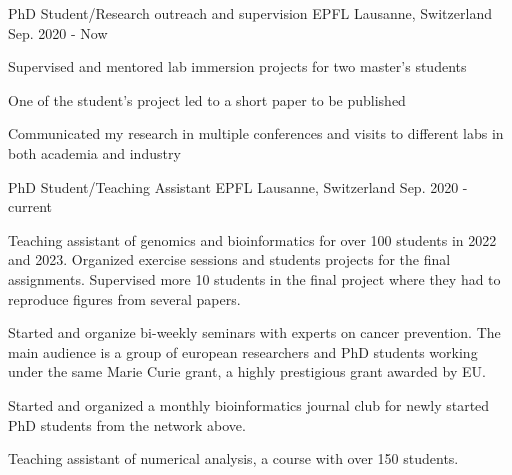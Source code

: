 

\begin{cventries}
  \cventry
    {PhD Student/Research outreach and supervision} %
    {EPFL} %
    {Lausanne, Switzerland} %
    {Sep. 2020 - Now} %
    {
      \begin{cvitems} %
          \item Supervised and mentored lab immersion projects for two
                master's students
          \item One of the student's project led to a short paper to be 
                published
          \item Communicated my research in multiple conferences and 
                visits to different labs in both academia and industry
      \end{cvitems}
    }
 
 \cventry
    {PhD Student/Teaching Assistant} %
    {EPFL} %
    {Lausanne, Switzerland} %
    {Sep. 2020 - current} %
    {
      \begin{cvitems} %
          \item Teaching assistant of genomics and bioinformatics for over 100 
                students in 2022 and 2023. Organized exercise sessions and 
                students projects for the final assignments. Supervised more
                10 students in the final project where they had to reproduce
                figures from several papers.
          \item Started and organize bi-weekly seminars with experts on cancer
                prevention. The main audience is a group of european 
                researchers and PhD students working under the same Marie Curie
                grant, a highly prestigious grant awarded by EU.  
          \item Started and organized a monthly bioinformatics journal club for
                newly started PhD students from the network above.
          \item Teaching assistant of numerical analysis, 
                a course with over 150 students.
      \end{cvitems}
    }


\end{cventries}
